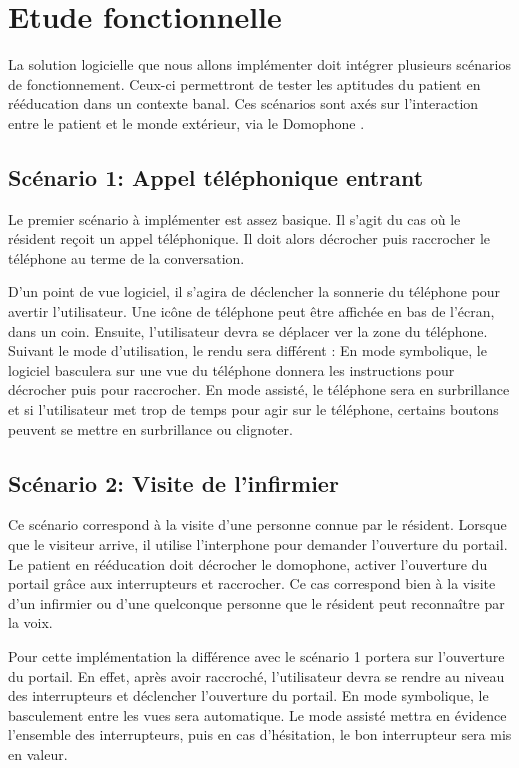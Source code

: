 

\section{Etude fonctionnelle}

La solution logicielle que nous allons implémenter doit intégrer plusieurs scénarios de fonctionnement. Ceux-ci permettront de tester les aptitudes du patient en rééducation dans un contexte banal. Ces scénarios sont axés sur l'interaction entre le patient et le monde extérieur, via le \og Domophone \fg{}. 

\subsection{Scénario 1: Appel téléphonique entrant}

Le premier scénario à implémenter est assez basique. Il s'agit du cas où le résident reçoit un appel téléphonique. Il doit alors décrocher puis raccrocher le téléphone au terme de la conversation.

D'un point de vue logiciel, il s'agira de déclencher la sonnerie du téléphone pour avertir l'utilisateur. Une icône de téléphone peut être affichée en bas de l'écran, dans un coin. Ensuite, l'utilisateur devra se déplacer ver la zone du téléphone. Suivant le mode d'utilisation, le rendu sera différent : En mode symbolique, le logiciel basculera sur une vue du téléphone donnera les instructions pour décrocher puis pour raccrocher. En mode assisté, le téléphone sera en surbrillance et si l'utilisateur met trop de temps pour agir sur le téléphone, certains boutons peuvent se mettre en surbrillance ou clignoter.

\subsection{Scénario 2: Visite de l'infirmier}

Ce scénario correspond à la visite d'une personne connue par le résident. Lorsque que le visiteur arrive, il utilise l'interphone pour demander l'ouverture du portail. Le patient en rééducation doit décrocher le domophone, activer l'ouverture du portail grâce aux interrupteurs et raccrocher. Ce cas correspond bien à la visite d'un infirmier ou d'une quelconque personne que le résident peut reconnaître par la voix. 

Pour cette implémentation la différence avec le scénario 1 portera sur l'ouverture du portail. En effet, après avoir raccroché, l'utilisateur devra se rendre au niveau des interrupteurs et déclencher l'ouverture du portail. En mode symbolique, le basculement entre les vues sera automatique. Le mode assisté mettra en évidence l'ensemble des interrupteurs, puis en cas d'hésitation, le bon interrupteur sera mis en valeur.

